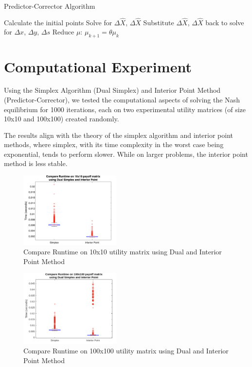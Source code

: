 \documentclass[journal, 11pt, a4paper, twoside]{IEEEtran}
\begin{document}
\begin{algorithm}
    \caption{Predictor-Corrector Algorithm}
    \begin{algorithmic}
    \State Calculate the initial points
        \State Solve for $\Delta\hat{X}$, $\Delta\hat{X}$
        \State Substitute $\Delta\hat{X}$, $\Delta\hat{X}$ back to solve for $\Delta{x}$, $\Delta{y}$, $\Delta{s}$
        \State Reduce $\mu$: $\mu_{k+1} = \theta\mu_{k}$
    \EndFor
    \end{algorithmic}
\end{algorithm} 


\section{Computational Experiment}
Using the Simplex Algorithm (Dual Simplex) and Interior Point Method (Predictor-Corrector), we tested the computational aspects of solving the Nash equilibrium for 1000 iterations, each on two experimental utility matrices (of size 10x10 and 100x100) created randomly.

The results align with the theory of the simplex algorithm and interior point methods, where simplex, with its time complexity in the worst case being exponential, tends to perform slower. While on larger problems, the interior point method is less stable. 
\begin{figure}[!htb]
    \centering
    \includegraphics[width=0.45\textwidth]{images/10x10.png}
    \caption{Compare Runtime on 10x10 utility matrix using Dual and Interior Point Method}
    \label{fig:10x10}
\end{figure}
\begin{figure}[!htb]
    \centering
    \includegraphics[width=0.45\textwidth]{images/100x100.png}
    \caption{Compare Runtime on 100x100 utility matrix using Dual and Interior Point Method}
    \label{fig:100x100}
\end{figure}
\end{document}

